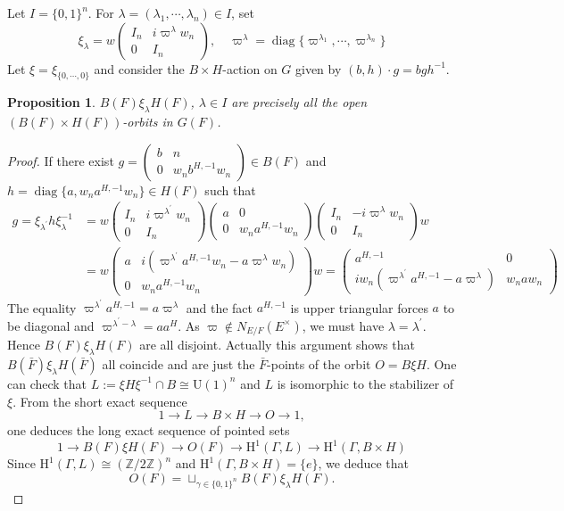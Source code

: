 \documentclass{amsart}
\newtheorem{prop}[theorem]{Proposition}
\theoremstyle{definition}
\theoremstyle{remark}
\newcommand{\1}{\mathbf{1}}
\newcommand{\h}{\mathrm{H}}
\newcommand{\U}{\mathrm{U}}
\DeclareMathOperator{\diag}{diag}
\theoremstyle{definition}
\newcommand{\BZ}{{\mathbb {Z}}}
\begin{document}
Let $I=\{0,1\}^n$.  For $\lambda=(\lambda_1,\cdots, \lambda_n)\in I$, set \[\xi_\lambda=w\begin{pmatrix}I_n & i \varpi^\lambda w_n\\ 0 & I_n\end{pmatrix},\quad \varpi^\lambda= \diag\{\varpi^{\lambda_1},\cdots, \varpi^{\lambda_n}\}\]
 Let $\xi=\xi_{\{0,\cdots,0\}}$ and consider the $B\times H$-action on $G$ given by $(b,h)\cdot g= bg h^{-1}$. 
\begin{prop}   $B(F)\xi_\lambda H(F)$, $\lambda\in I$ are precisely all the open $(B(F)\times H(F))$-orbits in $G(F)$.  \end{prop}
\begin{proof} If there exist $g=\begin{pmatrix} b & n \\ 0 & w_n b^{H,-1} w_n\end{pmatrix}\in B(F)$ and $h=\diag\{a, w_n a^{H,-1}w_n\}\in H(F)$ such that \begin{align*}
 g=\xi_{\lambda^\prime}h\xi_\lambda^{-1}&=w \begin{pmatrix} I_n & i \varpi^{\lambda^\prime}w_n \\ 0 & I_n\end{pmatrix} \begin{pmatrix}a & 0 \\ 0 & w_n a^{H,-1}w_n\end{pmatrix} \begin{pmatrix} I_n & -i \varpi^{\lambda}w_n \\ 0 & I_n\end{pmatrix}w\\   
 &=w\begin{pmatrix} a & i (\varpi^{\lambda^\prime}a^{H,-1}w_n-a\varpi^{\lambda}w_n)\\ 0 & w_n a^{H,-1}w_n\end{pmatrix}w=\begin{pmatrix} a^{H,-1} & 0\\ i w_n(\varpi^{\lambda^\prime}a^{H,-1}-a\varpi^{\lambda}) & w_n aw_n\end{pmatrix}
\end{align*}
The equality $\varpi^{\lambda^\prime}a^{H,-1}=a\varpi^\lambda$ and the fact $a^{H,-1}$ is upper triangular forces $a$ to be diagonal and $\varpi^{\lambda^{\prime}-\lambda}=aa^H$. As $\varpi\notin N_{E/F}(E^\times)$, we must have $\lambda=\lambda^\prime$. Hence $B(F)\xi_\lambda H(F)$ are all disjoint. Actually this argument shows that $B(\bar{F})\xi_\lambda H(\bar{F})$ all coincide and are just the $\bar{F}$-points of the orbit $O=B \xi H$. One can check that $L:=\xi H\xi^{-1}\cap B\cong \U(1)^n$ and $L$ is isomorphic to the stabilizer of $\xi$. 
From the short exact sequence 
\[1\to L\to B\times H\to O\to1,\]
one deduces the long exact sequence of pointed sets 
\[1\to B(F)\xi H(F)\to O(F)\to \h^1(\Gamma, L)\to \h^1(\Gamma, B\times H)\]
Since $\h^1(\Gamma, L)\cong (\BZ/2\BZ)^n$ and $\h^1(\Gamma, B\times H)=\{e\}$, we deduce that 
\[O(F)=\sqcup_{\gamma\in \{0,1\}^n}B(F)\xi_\lambda H(F).\]



\end{proof}
\end{document}
